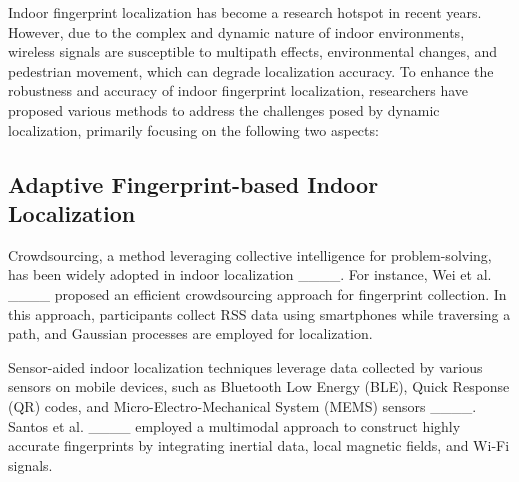 Indoor fingerprint localization has become a research hotspot in recent years. However, due to the complex and dynamic nature of indoor environments, wireless signals are susceptible to multipath effects, environmental changes, and pedestrian movement, which can degrade localization accuracy. To enhance the robustness and accuracy of indoor fingerprint localization, researchers have proposed various methods to address the challenges posed by dynamic localization, primarily focusing on the following two aspects:

\subsection{Adaptive Fingerprint-based Indoor Localization}
Crowdsourcing, a method leveraging collective intelligence for problem-solving, has been widely adopted in indoor localization ____. For instance, Wei et al. ____ proposed an efficient crowdsourcing approach for fingerprint collection. In this approach, participants collect RSS data using smartphones while traversing a path, and Gaussian processes are employed for localization.

Sensor-aided indoor localization techniques leverage data collected by various sensors on mobile devices, such as Bluetooth Low Energy (BLE), Quick Response (QR) codes, and Micro-Electro-Mechanical System (MEMS) sensors ____. Santos et al. ____ employed a multimodal approach to construct highly accurate fingerprints by integrating inertial data, local magnetic fields, and Wi-Fi signals.

